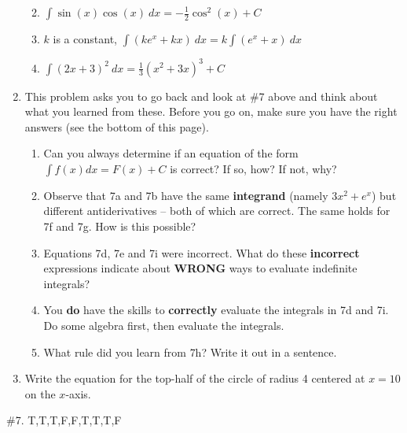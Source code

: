 \documentclass[12pt]{article}
\renewcommand{\emph}[1]{\textsf{\textbf{#1}}}
\begin{document}
\begin{enumerate}
\begin{enumerate}
	\vfill
	\item $\displaystyle{\int \sin(x) \cos(x) \: dx = -\frac{1}{2}\cos^2(x) +C}$
	\vfill
	\item $k$ is a constant, $\displaystyle{\int (ke^x+kx) \: dx = k\int (e^x+x) \: dx}$
	\vfill
	\item $\displaystyle{\int (2x+3)^2 \: dx = \frac{1}{3}(x^2+3x)^3 +C}$
	\vfill
	\end{enumerate}
\newpage
\item This problem asks you to go back and look at \#7 above and think about what you learned from these. Before you go on, make sure you have the right answers (see the bottom of this page).
\begin{enumerate}
	\item Can you always determine if an equation of the form $\int f(x) dx=F(x) +C$ is correct? If so, how? If not, why?\\
	\vfill
	\item Observe that 7a and 7b have the same \emph{integrand} (namely $3x^2+e^x$) but different antiderivatives -- both of which are correct. The same holds for 7f and 7g. How is this possible?
	\vfill
	\item Equations 7d, 7e and 7i were incorrect. What do these \emph{incorrect} expressions indicate about \emph{WRONG} ways to evaluate indefinite integrals?
	\vfill
	\item You \emph{do} have the skills to \emph{correctly} evaluate the integrals in 7d and 7i. Do some algebra first, then evaluate the integrals.
	\vfill
	\item What rule did you learn from 7h? Write it out in a sentence.
	\vfill
	\end{enumerate}
\item Write the equation for the top-half of the circle of radius 4 centered at $x=10$ on the $x$-axis.
\vfill
\end{enumerate}
\#7. T,T,T,F,F,T,T,T,F
\end{document}
